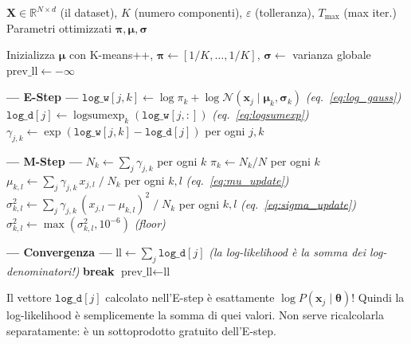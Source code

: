 \documentclass[11pt,a4paper]{article}
\begin{document}
\begin{algorithm}[H]
\caption{EM per GMM con covarianza diagonale -- versione dettagliata}
\begin{algorithmic}[1]
\Require $\mathbf{X} \in \mathbb{R}^{N \times d}$ (il dataset), $K$ (numero componenti), $\varepsilon$ (tolleranza), $T_{\max}$ (max iter.)
\Ensure Parametri ottimizzati $\boldsymbol{\pi}, \boldsymbol{\mu}, \boldsymbol{\sigma}$

\State Inizializza $\boldsymbol{\mu}$ con K-means++, $\boldsymbol{\pi} \leftarrow [1/K, \ldots, 1/K]$, $\boldsymbol{\sigma} \leftarrow$ varianza globale
\State $\text{prev\_ll} \leftarrow -\infty$


    \Statex \hspace{1em}\textbf{--- E-Step ---}
        \State $\texttt{log\_w}[j,k] \leftarrow \log\pi_k + \log\mathcal{N}(\mathbf{x}_j\mid\boldsymbol{\mu}_k, \boldsymbol{\sigma}_k)$ \quad \emph{(eq.~\eqref{eq:log_gauss})}
    \EndFor
        \State $\texttt{log\_d}[j] \leftarrow \operatorname{logsumexp}_k(\texttt{log\_w}[j,:])$ \quad \emph{(eq.~\eqref{eq:logsumexp})}
    \EndFor
    \State $\gamma_{j,k} \leftarrow \exp(\texttt{log\_w}[j,k] - \texttt{log\_d}[j])$ \quad per ogni $j, k$

    \Statex \hspace{1em}\textbf{--- M-Step ---}
    \State $N_k \leftarrow \sum_j \gamma_{j,k}$ \quad per ogni $k$
    \State $\pi_k \leftarrow N_k / N$ \quad per ogni $k$
    \State $\mu_{k,l} \leftarrow \sum_j \gamma_{j,k}\, x_{j,l} \;/\; N_k$ \quad per ogni $k, l$  \quad \emph{(eq.~\eqref{eq:mu_update})}
    \State $\sigma_{k,l}^2 \leftarrow \sum_j \gamma_{j,k}\,(x_{j,l} - \mu_{k,l})^2 \;/\; N_k$ \quad per ogni $k, l$ \quad \emph{(eq.~\eqref{eq:sigma_update})}
    \State $\sigma_{k,l}^2 \leftarrow \max(\sigma_{k,l}^2, 10^{-6})$ \quad \emph{(floor)}

    \Statex \hspace{1em}\textbf{--- Convergenza ---}
    \State $\text{ll} \leftarrow \sum_j \texttt{log\_d}[j]$ \quad \emph{(la log-likelihood \`e la somma dei log-denominatori!)}
        \State \textbf{break}
    \EndIf
    \State $\text{prev\_ll} \leftarrow \text{ll}$
\EndFor
\end{algorithmic}
\end{algorithm}

\begin{tipbox}
Il vettore $\texttt{log\_d}[j]$ calcolato nell'E-step \`e esattamente $\log P(\mathbf{x}_j\mid\boldsymbol{\theta})$! Quindi la log-likelihood \`e semplicemente la somma di quei valori. Non serve ricalcolarla separatamente: \`e un sottoprodotto gratuito dell'E-step.
\end{tipbox}
\end{document}
